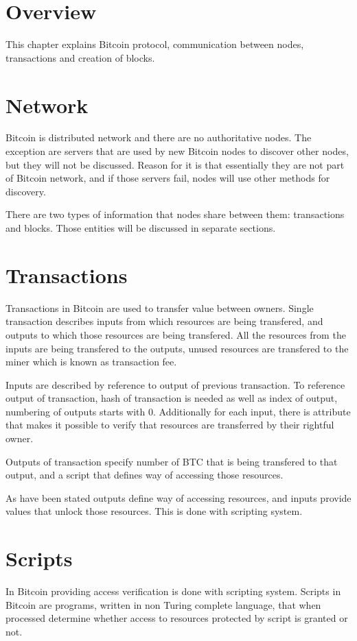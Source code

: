 \documentclass[12pt, en, eng, oneside]{mgr}
\begin{document}
\section{Overview}

This chapter explains Bitcoin protocol, communication between nodes, transactions and creation of blocks.

\section{Network}
Bitcoin is distributed network and there are no authoritative nodes. The exception are servers that are used by new Bitcoin nodes to discover other nodes, but they will not be discussed. Reason for it is that essentially they are not part of Bitcoin network, and if those servers fail, nodes will use other methods for discovery. 

There are two types of information that nodes share between them: transactions and blocks. \cite{bitcoin-paper-1} Those entities will be discussed in separate sections.

\section{Transactions}
Transactions in Bitcoin are used to transfer value between owners. Single transaction describes inputs from which resources are being transfered, and outputs to which those resources are being transfered. All the resources from the inputs are being transfered to the outputs, unused resources are transfered to the miner which is known as transaction fee.

Inputs are described by reference to output of previous transaction. To reference output of transaction, hash of transaction is needed as well as index of output, numbering of outputs starts with 0. Additionally for each input, there is attribute that makes it possible to verify that resources are transferred by their rightful owner. \cite{bitcoin-transaction}

Outputs of transaction specify number of BTC that is being transfered to that output, and a script that defines way of accessing those resources. 

As have been stated outputs define way of accessing resources, and inputs provide values that unlock those resources. This is done with scripting system.

\section{Scripts}
In Bitcoin providing access verification is done with scripting system. Scripts in Bitcoin are programs, written in non Turing complete language, that when processed determine whether access to resources protected by script is granted or not. \cite{bitcoin-script}
\end{document}

